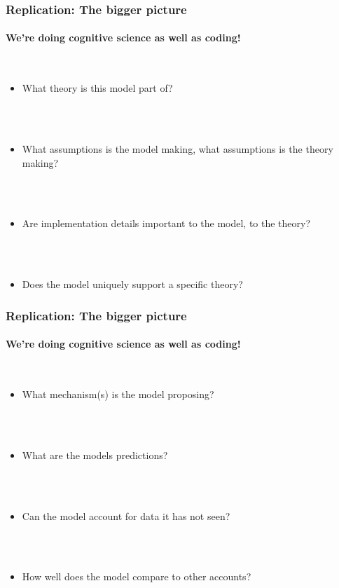 \documentclass{beamer}
\begin{document}
\begin{frame}[fragile]
\frametitle{Replication: The bigger picture}
\framesubtitle{We're doing cognitive science as well as coding!}
        \  \\

\begin{itemize}
\item<2-> What theory is this model part of?

\ \\

\ \\

 \item <3-> What assumptions is the model making, what assumptions is the theory making?
 
\ \\

 \ \\
 
\item<4-> Are implementation details important to the model, to the theory? 

 
\ \\

 \ \\
 
\item<5-> Does the model uniquely support a specific theory? 
\end{itemize}


\end{frame}
\begin{frame}[fragile]
\frametitle{Replication: The bigger picture}
\framesubtitle{We're doing cognitive science as well as coding!}
        \  \\

\begin{itemize}
\item<2-> What mechanism(s) is the model proposing?

\ \\

\ \\

 \item <3-> What are the models predictions? 
 
\ \\

 \ \\
 
\item<4-> Can the model account for data it has not seen?

 
\ \\

 \ \\
 
\item<5-> How well does the model compare to other accounts?
\end{itemize}


\end{frame}
\end{document}
